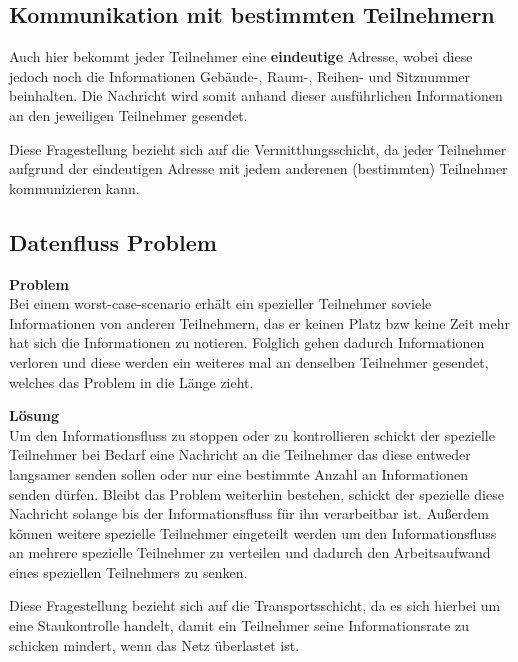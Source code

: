 \documentclass{scrartcl}
\begin{document}
    \subsection[Aufgabe 8 Kommunikation mit bestimmten Teilnehmern]{Kommunikation mit bestimmten Teilnehmern}
    
    Auch hier bekommt jeder Teilnehmer eine \textbf{eindeutige} Adresse, wobei diese jedoch noch die Informationen Gebäude-, Raum-, Reihen- und Sitznummer beinhalten. Die Nachricht wird somit anhand dieser ausführlichen Informationen an den jeweiligen Teilnehmer gesendet.
    
    Diese Fragestellung bezieht sich auf die Vermittlungsschicht, da jeder Teilnehmer aufgrund der eindeutigen Adresse mit jedem anderenen (bestimmten) Teilnehmer kommunizieren kann.
    
     \subsection[Aufgabe 9 Datenfluss Problem]{Datenfluss Problem}
     
     \textbf{Problem}\\
     Bei einem worst-case-scenario erhält ein spezieller Teilnehmer soviele Informationen von anderen Teilnehmern, das er keinen Platz bzw keine Zeit mehr hat sich die Informationen zu notieren. Folglich gehen dadurch Informationen verloren und diese werden ein weiteres mal an denselben Teilnehmer gesendet, welches das Problem in die Länge zieht.
     
     \textbf{Lösung}\\
     Um den Informationsfluss zu stoppen oder zu kontrollieren schickt der spezielle Teilnehmer bei Bedarf eine Nachricht an die Teilnehmer das diese entweder langsamer senden sollen oder nur eine bestimmte Anzahl an Informationen senden dürfen. Bleibt das Problem weiterhin bestehen, schickt der spezielle diese Nachricht solange bis der Informationsfluss für ihn verarbeitbar ist.
     Außerdem können weitere spezielle Teilnehmer eingeteilt werden um den Informationsfluss an mehrere spezielle Teilnehmer zu verteilen und dadurch den Arbeitsaufwand eines speziellen Teilnehmers zu senken.
     
     Diese Fragestellung bezieht sich auf die Transportsschicht, da es sich hierbei um eine Staukontrolle handelt, damit ein Teilnehmer seine Informationsrate zu schicken mindert, wenn das Netz überlastet ist.

  \newpage
\end{document}
